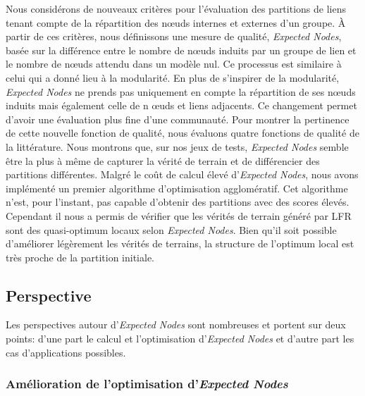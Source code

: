 Nous considérons de nouveaux critères pour l'évaluation des partitions de liens tenant compte de la répartition des n\oe uds internes et externes d'un groupe.
\`A partir de ces critères, nous définissons une mesure de qualité, \emph{Expected Nodes}, basée sur la différence entre le nombre de n\oe uds induits par un groupe de lien et le nombre de n\oe uds attendu dans un modèle nul.
Ce processus est similaire à celui qui a donné lieu à la modularité.
En plus de s'inspirer de la modularité, \emph{Expected Nodes} ne prends pas uniquement en compte la répartition de ses n\oe uds induits mais également celle de n \oe uds et liens adjacents.
Ce changement permet d'avoir une évaluation plus fine d'une communauté.
Pour montrer la pertinence de cette nouvelle fonction de qualité, nous évaluons quatre fonctions de qualité de la littérature.
Nous montrons que, sur nos jeux de tests, \emph{Expected Nodes} semble être la plus à même de capturer la vérité de terrain et de différencier des partitions différentes.
Malgré le coût de calcul élevé d'\emph{Expected Nodes}, nous avons implémenté un premier algorithme d'optimisation agglomératif.
Cet algorithme n'est, pour l'instant, pas capable d'obtenir des partitions avec des scores élevés.
Cependant il nous a permis de vérifier que les vérités de terrain généré par LFR sont des quasi-optimum locaux selon \emph{Expected Nodes}.
Bien qu'il soit possible d'améliorer légèrement les vérités de terrains, la structure de l'optimum local est très proche de la partition initiale.


\subsection{Perspective}

Les perspectives autour d'\emph{Expected Nodes} sont nombreuses et portent sur deux points: d'une part le calcul et l'optimisation d'\emph{Expected Nodes} et d'autre part les cas d'applications possibles.

\subsubsection{Amélioration de l'optimisation d'\emph{Expected Nodes}}

